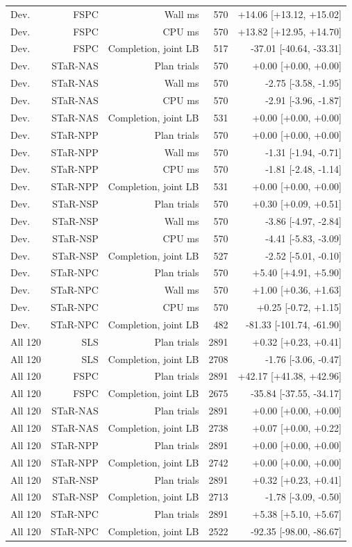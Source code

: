 \begin{longtable}{@{}lrrrr@{}}
Dev. & FSPC & Wall ms & 570 & +14.06 [+13.12, +15.02] \\
Dev. & FSPC & CPU ms & 570 & +13.82 [+12.95, +14.70] \\
Dev. & FSPC & Completion, joint LB & 517 & -37.01 [-40.64, -33.31] \\
Dev. & STaR-NAS & Plan trials & 570 & +0.00 [+0.00, +0.00] \\
Dev. & STaR-NAS & Wall ms & 570 & -2.75 [-3.58, -1.95] \\
Dev. & STaR-NAS & CPU ms & 570 & -2.91 [-3.96, -1.87] \\
Dev. & STaR-NAS & Completion, joint LB & 531 & +0.00 [+0.00, +0.00] \\
Dev. & STaR-NPP & Plan trials & 570 & +0.00 [+0.00, +0.00] \\
Dev. & STaR-NPP & Wall ms & 570 & -1.31 [-1.94, -0.71] \\
Dev. & STaR-NPP & CPU ms & 570 & -1.81 [-2.48, -1.14] \\
Dev. & STaR-NPP & Completion, joint LB & 531 & +0.00 [+0.00, +0.00] \\
Dev. & STaR-NSP & Plan trials & 570 & +0.30 [+0.09, +0.51] \\
Dev. & STaR-NSP & Wall ms & 570 & -3.86 [-4.97, -2.84] \\
Dev. & STaR-NSP & CPU ms & 570 & -4.41 [-5.83, -3.09] \\
Dev. & STaR-NSP & Completion, joint LB & 527 & -2.52 [-5.01, -0.10] \\
Dev. & STaR-NPC & Plan trials & 570 & +5.40 [+4.91, +5.90] \\
Dev. & STaR-NPC & Wall ms & 570 & +1.00 [+0.36, +1.63] \\
Dev. & STaR-NPC & CPU ms & 570 & +0.25 [-0.72, +1.15] \\
Dev. & STaR-NPC & Completion, joint LB & 482 & -81.33 [-101.74, -61.90] \\
All 120 & SLS & Plan trials & 2891 & +0.32 [+0.23, +0.41] \\
All 120 & SLS & Completion, joint LB & 2708 & -1.76 [-3.06, -0.47] \\
All 120 & FSPC & Plan trials & 2891 & +42.17 [+41.38, +42.96] \\
All 120 & FSPC & Completion, joint LB & 2675 & -35.84 [-37.55, -34.17] \\
All 120 & STaR-NAS & Plan trials & 2891 & +0.00 [+0.00, +0.00] \\
All 120 & STaR-NAS & Completion, joint LB & 2738 & +0.07 [+0.00, +0.22] \\
All 120 & STaR-NPP & Plan trials & 2891 & +0.00 [+0.00, +0.00] \\
All 120 & STaR-NPP & Completion, joint LB & 2742 & +0.00 [+0.00, +0.00] \\
All 120 & STaR-NSP & Plan trials & 2891 & +0.32 [+0.23, +0.41] \\
All 120 & STaR-NSP & Completion, joint LB & 2713 & -1.78 [-3.09, -0.50] \\
All 120 & STaR-NPC & Plan trials & 2891 & +5.38 [+5.10, +5.67] \\
All 120 & STaR-NPC & Completion, joint LB & 2522 & -92.35 [-98.00, -86.67] \\
\bottomrule
\end{longtable}
\endgroup
